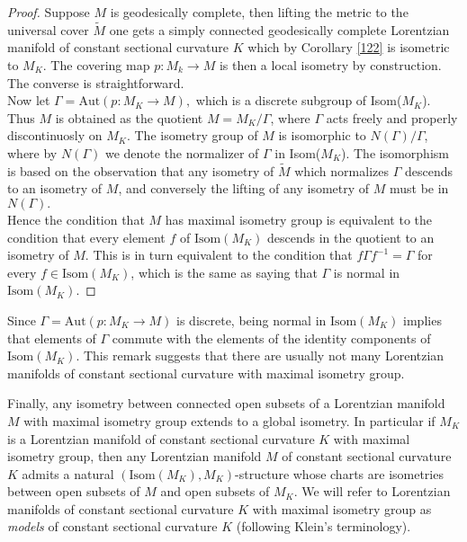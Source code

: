 \begin{proof}
    Suppose $M$ is geodesically complete, then lifting the metric to the universal cover $\widetilde{M}$ one gets a simply connected geodesically complete Lorentzian manifold of constant sectional curvature $K$ which by Corollary \ref{122} is isometric to $M_K$. The covering map $p:M_k\to M$ is then a local isometry by construction. The converse is straightforward. \\   
    Now let $\Gamma=\text{Aut}(p:M_K\to M),$ which is a discrete subgroup of Isom($M_K$). Thus $M$ is obtained as the quotient $M=M_{K}/\Gamma$, where $\Gamma$ acts freely and properly discontinuosly on $M_K$. The isometry group of $M$ is isomorphic to $N(\Gamma)/\Gamma$, where by $N(\Gamma)$ we denote the normalizer of $\Gamma$ in Isom($M_K$). The isomorphism is based on the observation that any isometry of $\widetilde{M}$ which normalizes $\Gamma$ descends to an isometry of $M$, and conversely the lifting of any isometry of $M$ must be in $N(\Gamma).$\\
    Hence the condition that $M$ has maximal isometry group is equivalent to the condition that every element $f$ of $\text{Isom}(M_K)$ descends in the quotient to an isometry of $M$. This is in turn equivalent to the condition that $f\Gamma f^{-1}=\Gamma$ for every $f\in \text{Isom}(M_K)$, which is the same as saying that $\Gamma$ is normal in $\text{Isom}(M_K)$.
\end{proof}

\begin{observation}
Since $\Gamma=\text{Aut}(p:M_K\to M)$ is discrete, being normal in $\text{Isom}(M_K)$ implies that elements of $\Gamma$ commute with the elements of the identity components of $\text{Isom}(M_K)$. This remark suggests that there are usually not many Lorentzian manifolds of constant sectional curvature with maximal isometry group.
\end{observation}

Finally, any isometry between connected open subsets of a Lorentzian manifold $M$ with maximal isometry group extends to a global isometry. In particular if $M_K$ is a Lorentzian manifold of constant sectional curvature $K$ with maximal isometry group, then any Lorentzian manifold $M$ of constant sectional curvature $K$ admits a natural $(\text{Isom}(M_K), M_K)$-structure whose charts are isometries between open subsets of $M$ and open subsets of $M_K$. We will refer to Lorentzian manifolds of constant sectional curvature $K$ with maximal isometry group as \textit{models} of constant sectional curvature $K$ (following Klein's terminology).  